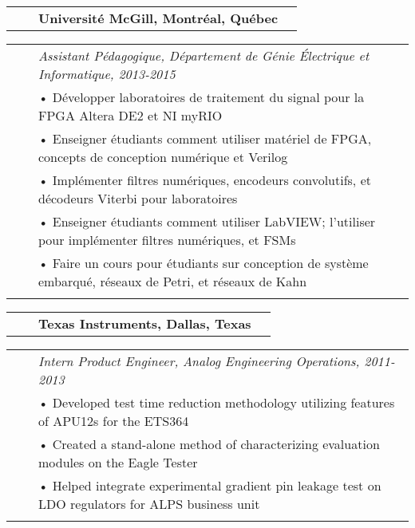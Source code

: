 \documentclass{minimal}
\begin{document}
\begin{tabular}{ p{1.5cm} p{1cm} p{10cm} >{\raggedleft\arraybackslash}p{3cm} }
& & \textbf{Université McGill, Montréal, Québec} & \\
\end{tabular}

\begin{tabular}{ p{1.5cm} p{1cm} p{16cm} }
& & \textit{Assistant Pédagogique, Département de Génie Électrique et Informatique, 2013-2015}\\
& & • Développer laboratoires de traitement du signal pour la FPGA Altera DE2 et NI myRIO\\
& & • Enseigner étudiants comment utiliser matériel de FPGA, concepts de conception numérique et Verilog\\ 
& & • Implémenter filtres numériques, encodeurs convolutifs, et décodeurs Viterbi pour laboratoires\\
& & • Enseigner étudiants comment utiliser LabVIEW; l'utiliser pour implémenter filtres numériques, et FSMs\\
& & • Faire un cours pour étudiants sur conception de système embarqué, réseaux de Petri, et réseaux de Kahn\\
& & \\
\end{tabular}

\pagebreak

\begin{tabular}{ p{1.5cm} p{1cm} p{10cm} >{\raggedleft\arraybackslash}p{3cm} }
& & \textbf{Texas Instruments, Dallas, Texas} & \\
\end{tabular}

\begin{tabular}{ p{1.5cm} p{1cm} p{16cm} }
& & \textit{Intern Product Engineer, Analog Engineering Operations, 2011-2013}\\
& & • Developed test time reduction methodology utilizing features of APU12s for the ETS364\\
& & • Created a stand-alone method of characterizing evaluation modules on the Eagle Tester\\
& & • Helped integrate experimental gradient pin leakage test on LDO regulators for ALPS business unit\\
& & \\
\end{tabular}
\end{document}
